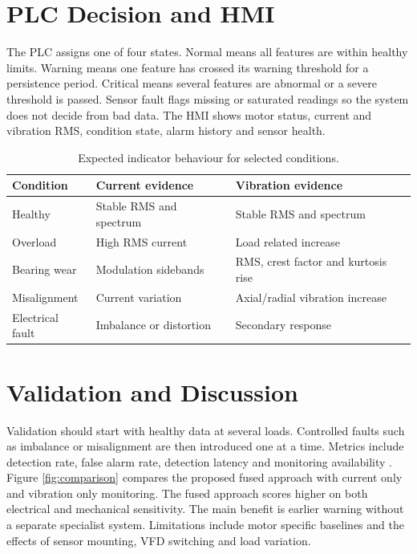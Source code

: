 \documentclass[10pt,a4paper,twocolumn]{article}
\begin{document}
\section*{PLC Decision and HMI}
The PLC assigns one of four states. Normal means all features are within healthy limits. Warning means one feature has crossed its warning threshold for a persistence period. Critical means several features are abnormal or a severe threshold is passed. Sensor fault flags missing or saturated readings so the system does not decide from bad data. The HMI shows motor status, current and vibration RMS, condition state, alarm history and sensor health.

\begin{table}[htbp]
\centering
\scriptsize
\caption{Expected indicator behaviour for selected conditions.}
\label{tab:conditions}
\begin{tabular}{>{\raggedright\arraybackslash}p{1.4cm}>{\raggedright\arraybackslash}p{2.4cm}>{\raggedright\arraybackslash}p{2.4cm}}
\toprule
Condition & Current evidence & Vibration evidence \\
\midrule
Healthy & Stable RMS and spectrum & Stable RMS and spectrum \\
Overload & High RMS current & Load related increase \\
Bearing wear & Modulation sidebands & RMS, crest factor and kurtosis rise \\
Misalignment & Current variation & Axial/radial vibration increase \\
Electrical fault & Imbalance or distortion & Secondary response \\
\bottomrule
\end{tabular}
\end{table}

\section*{Validation and Discussion}
Validation should start with healthy data at several loads. Controlled faults such as imbalance or misalignment are then introduced one at a time. Metrics include detection rate, false alarm rate, detection latency and monitoring availability \citep{iec2026}. Figure \ref{fig:comparison} compares the proposed fused approach with current only and vibration only monitoring. The fused approach scores higher on both electrical and mechanical sensitivity. The main benefit is earlier warning without a separate specialist system. Limitations include motor specific baselines and the effects of sensor mounting, VFD switching and load variation.
\end{document}
